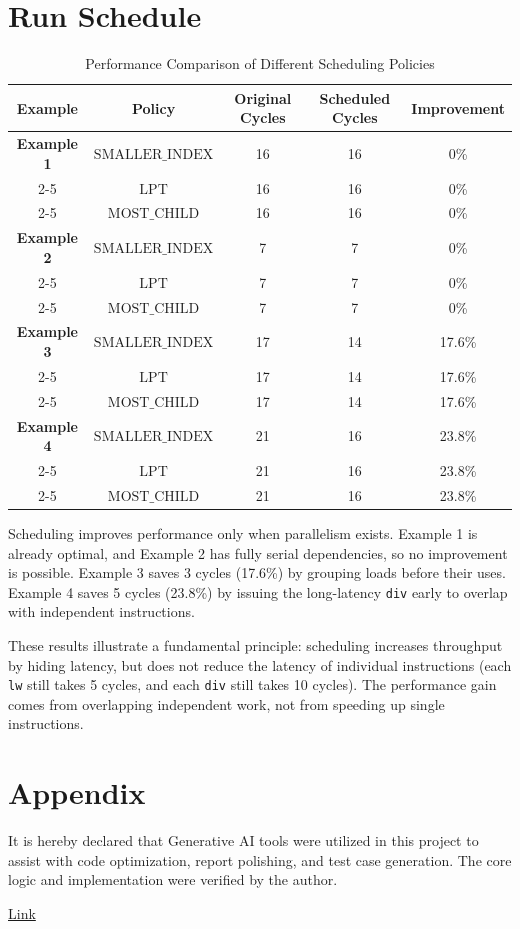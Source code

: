\documentclass[11pt]{article}
\begin{document}
\section{Run Schedule}
\begin{table}[h]
\centering
\caption{Performance Comparison of Different Scheduling Policies}
\begin{tabular}{|c|c|c|c|c|}
\hline
\textbf{Example} & \textbf{Policy} & \textbf{Original Cycles} & \textbf{Scheduled Cycles} & \textbf{Improvement} \\
\hline
{\textbf{Example 1}} & $\text{SMALLER\_INDEX}$ & 16 & 16 & 0\% \\
\cline{2-5}
 & $\text{LPT}$ & 16 & 16 & 0\% \\
\cline{2-5}
 & $\text{MOST\_CHILD}$ & 16 & 16 & 0\% \\
\hline
{\textbf{Example 2}} & $\text{SMALLER\_INDEX}$ & 7 & 7 & 0\% \\
\cline{2-5}
 & $\text{LPT}$ & 7 & 7 & 0\% \\
\cline{2-5}
 & $\text{MOST\_CHILD}$ & 7 & 7 & 0\% \\
\hline
{\textbf{Example 3}} & $\text{SMALLER\_INDEX}$ & 17 & 14 & 17.6\% \\
\cline{2-5}
 & $\text{LPT}$ & 17 & 14 & 17.6\% \\
\cline{2-5}
 & $\text{MOST\_CHILD}$ & 17 & 14 & 17.6\% \\
\hline
{\textbf{Example 4}} & $\text{SMALLER\_INDEX}$ & 21 & 16 & 23.8\% \\
\cline{2-5}
 & $\text{LPT}$ & 21 & 16 & 23.8\% \\
\cline{2-5}
 & $\text{MOST\_CHILD}$ & 21 & 16 & 23.8\% \\
\hline
\end{tabular}
\label{tab:scheduling_results}
\end{table}

Scheduling improves performance only when parallelism exists. Example 1 is already optimal, and Example 2 has fully serial dependencies, so no improvement is possible. Example 3 saves 3 cycles (17.6\%) by grouping loads before their uses. Example 4 saves 5 cycles (23.8\%) by issuing the long-latency \texttt{div} early to overlap with independent instructions.

These results illustrate a fundamental principle: scheduling increases throughput by hiding latency, but does not reduce the latency of individual instructions (each \texttt{lw} still takes 5 cycles, and each \texttt{div} still takes 10 cycles). The performance gain comes from overlapping independent work, not from speeding up single instructions.
\section{Appendix}
It is hereby declared that Generative AI tools were utilized in this project to assist with code optimization, report polishing, and test case generation. The core logic and implementation were verified by the author.

\href{https://chat.deepseek.com/share/dnj7n1mmywdevdsn7n}{Link}
\end{document}
